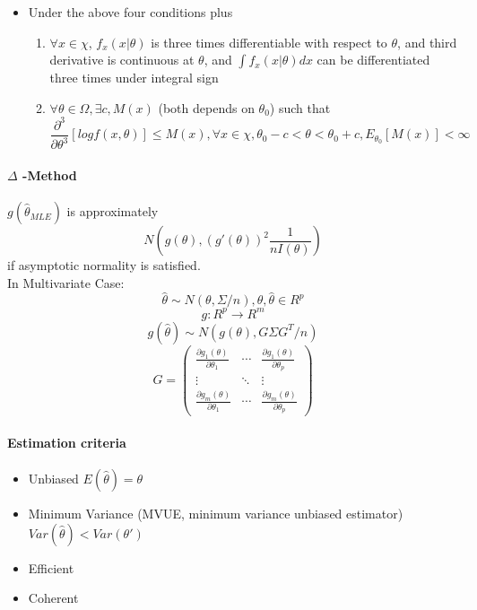 \documentclass[11pt, openany]{book}              %
\begin{document}
\begin{enumerate}
\begin{itemize}
    		\item Under the above four conditions plus 
    			\begin{enumerate}
    				\item $ \forall x \in \chi$, $f_x(x|\theta)$ is three times differentiable with respect to $\theta$, and third derivative is continuous at $\theta$, and $\int f_x(x|\theta) dx$ can be differentiated three times under integral sign
    				\item $ \forall \theta \in \Omega, \exists c, M(x)$ (both depends on $\theta_0$) such that
    				$$ \frac{\partial^3}{\partial \theta^3} [log f(x, \theta ) ] \leq M(x), \forall x \in \chi, \theta_0-c<\theta < \theta_0+c, E_{\theta_0} [M(x)] < \infty$$
    			\end{enumerate}
    		\end{itemize}
    	\end{enumerate}
    	
\paragraph{$\Delta$ -Method}

	$g(\hat{\theta}_{MLE})$ is approximately
    	  $$ N(g(\theta), (g'(\theta))^2 \frac{1}{nI(\theta)})$$ if asymptotic normality is satisfied. \\
    	  In Multivariate Case:
    	  $$ \hat{\theta} \sim N(\theta, \Sigma/n), \theta,\hat{\theta} \in R^p $$
    	  $$g: R^p \rightarrow R^m$$
    	  $$g(\hat{\theta}) \sim N(g(\theta), G\Sigma G^T/n)$$
		  $$ G = \begin{pmatrix} 
  				\frac{\partial{g_1(\theta)}}{\partial{\theta_1}}& \cdots & \frac{\partial{g_1(\theta)}}{\partial{\theta_p}}\\ 
  				\vdots & \ddots & \vdots \\
  				\frac{\partial{g_m(\theta)}}{\partial{\theta_1}}& \cdots & \frac{\partial{g_m(\theta)}}{\partial{\theta_p}} 
			\end{pmatrix} $$
			
\paragraph{Estimation criteria}
   		\begin{itemize}
   		 \item Unbiased $E(\hat{\theta}) = \theta$
   		 \item Minimum Variance (MVUE, minimum variance unbiased estimator) $Var(\hat{\theta}) < Var(\theta')$
   		 \item Efficient
   		 \item Coherent
   		 \end{itemize}
\end{document}
